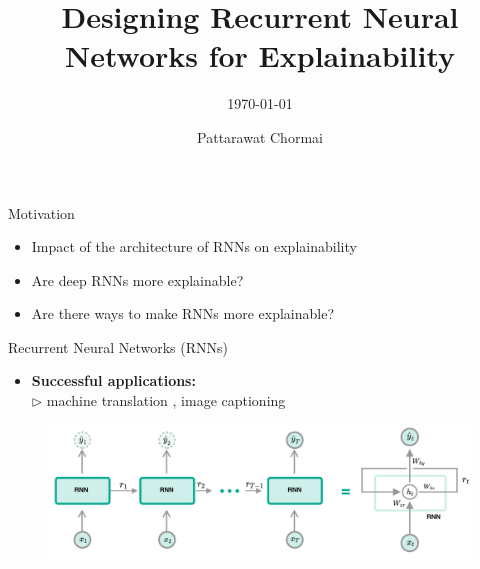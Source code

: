 \documentclass[Nike]{tuberlinbeamer}
\title{Designing Recurrent Neural Networks for Explainability}
\subtitle{\today}
\author[TU Berlin]{Pattarawat Chormai}
\institute{Technische Universität Berlin}
\begin{document}
\begin{frame}
\maketitle
\end{frame}




\begin{frame}{Motivation}

\begin{itemize}
	\item Impact of the architecture of RNNs on explainability
	\item Are deep RNNs more explainable? 
	\item Are there ways to make RNNs more explainable?
\end{itemize}
\end{frame}

\begin{frame}{Recurrent Neural Networks (RNNs)}

	\begin{itemize}
		\item \textbf{Successful applications:} \\ $\rhd$ machine translation \citep{DBLP:journals/corr/WuSCLNMKCGMKSJL16}, image captioning \citep{DBLP:conf/cvpr/VinyalsTBE15,DBLP:conf/nips/VaswaniSPUJGKP17}
	\end{itemize}
	\begin{figure}[h]
		\includegraphics [width=\textwidth]{figures/present_rnn_unfold_1}
	\end{figure}
 	
\end{frame}
\end{document}
